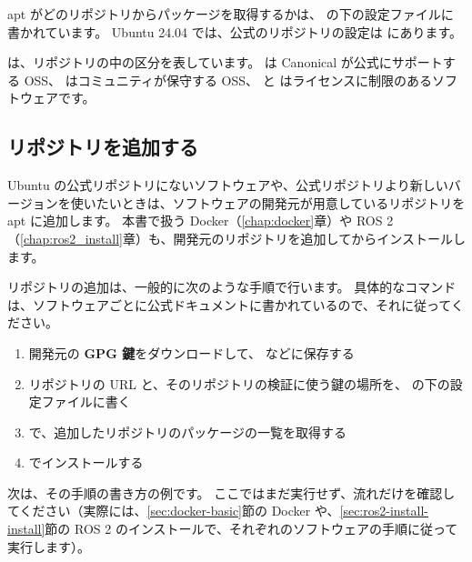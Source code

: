 apt がどのリポジトリからパッケージを取得するかは、 の下の設定ファイルに書かれています。
Ubuntu 24.04 では、公式のリポジトリの設定は  にあります。


 は、リポジトリの中の区分を表しています。
 は Canonical が公式にサポートする OSS、 はコミュニティが保守する OSS、 と  はライセンスに制限のあるソフトウェアです。

\subsection{リポジトリを追加する}

Ubuntu の公式リポジトリにないソフトウェアや、公式リポジトリより新しいバージョンを使いたいときは、ソフトウェアの開発元が用意しているリポジトリを apt に追加します。
本書で扱う Docker（\ref{chap:docker}章）や ROS 2（\ref{chap:ros2_install}章）も、開発元のリポジトリを追加してからインストールします。

リポジトリの追加は、一般的に次のような手順で行います。
具体的なコマンドは、ソフトウェアごとに公式ドキュメントに書かれているので、それに従ってください。

\begin{enumerate}
  \item 開発元の \textbf{GPG 鍵}をダウンロードして、 などに保存する
  \item リポジトリの URL と、そのリポジトリの検証に使う鍵の場所を、 の下の設定ファイルに書く
  \item {} で、追加したリポジトリのパッケージの一覧を取得する
  \item {} でインストールする
\end{enumerate}

次は、その手順の書き方の例です。
ここではまだ実行せず、流れだけを確認してください（実際には、\ref{sec:docker-basic}節の Docker や、\ref{sec:ros2-install-install}節の ROS 2 のインストールで、それぞれのソフトウェアの手順に従って実行します）。

